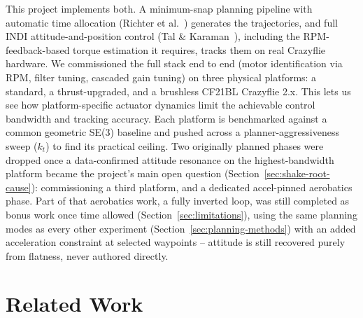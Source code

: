 \documentclass[11pt,a4paper]{article}
\begin{document}
This project implements both. A minimum-snap planning pipeline with automatic time allocation
(Richter et al.~\cite{richter2016}) generates the trajectories, and full INDI attitude-and-position
control (Tal \& Karaman~\cite{tal2020}), including the RPM-feedback-based torque estimation it requires,
tracks them on real Crazyflie hardware. We commissioned the full stack end to end (motor
identification via RPM, filter tuning, cascaded gain tuning) on three physical platforms: a
standard, a thrust-upgraded, and a brushless CF21BL Crazyflie 2.x. This lets us see how
platform-specific actuator dynamics limit the achievable control bandwidth and tracking accuracy.
Each platform is benchmarked against a common geometric SE(3) baseline and pushed across a
planner-aggressiveness sweep ($k_t$) to find its practical ceiling. Two originally planned phases
were dropped once a data-confirmed attitude resonance on the
highest-bandwidth platform became the project's main open question
(Section~\ref{sec:shake-root-cause}): commissioning a third platform, and a dedicated accel-pinned
aerobatics phase. Part of that aerobatics work, a fully inverted loop, was still completed as
bonus work once time allowed (Section~\ref{sec:limitations}), using the same planning modes as
every other experiment (Section~\ref{sec:planning-methods}) with an added acceleration constraint
at selected waypoints -- attitude is still recovered purely from flatness, never authored directly.

\section{Related Work}
\end{document}
